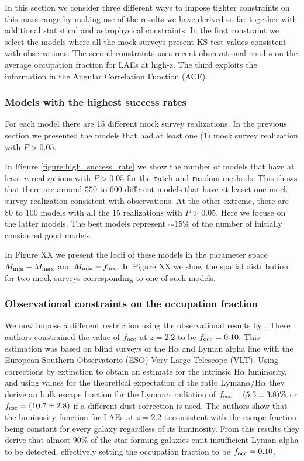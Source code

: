 \documentclass[usenatbib]{mn2e}
\begin{document}
In this section we consider three different ways to impose
tighter constraints on this mass range by making use of the results we
have derived so far together with additional statistical and
astrophysical constraints. In the first constraint we select the
models where all the mock surveys present KS-test values consistent
with observations. The second constraints uses recent observational
results on the average occupation fraction for LAEs at high-z. The
third exploits the information in the Angular Correlation Function
(ACF).  

\subsubsection{Models with the highest success rates}

For each model there are 15 different mock survey realizations. In the
previous section we presented the models that had at least one (1)
mock survey realization with $P>0.05$.

In Figure \ref{figure:high_success_rate} we show the number of models
that have at least $n$ realizations with $P>0.05$ for the {\texttt
  match} and {\texttt random} methods.  This shows that there are
around $550$ to $600$ different models that have at leaset one mock
survey realization consistent with observations. At the other extreme,
there are $80$ to $100$ models with all the 15 realizations with
$P>0.05$. Here we focuse on the latter models. The best models
represent $\sim 15\%$ of the number of initially considered good
models. 

In Figure XX we present the locii of these models in the parameter
space $M_{\rm min}-M_{\rm max}$ and $M_{\rm min}-f_{\rm occ}$. In
Figure XX we show the spatial distribution for two mock surveys
corresponding to one of such models. 




\subsubsection{Observational constraints on the occupation fraction}

We now impose a different restriction using the observational results
by \cite{Hayes2010}. These authors constrained the value of $f_{\rm
  occ}$ at $z=2.2$ to be $f_{\rm occ}=0.10$. This estimation was based
on blind surveys of the H$\alpha$ and Lyman alpha line with the European Southern
Observatorio (ESO) Very Large Telescope (VLT). Using corrections by
extinction to obtain an estimate for the intrinsic H$\alpha$
luminosity, and using values for the theoretical expectation of the
ratio Lyman$\alpha$/H$\alpha$ they derive an bulk escape fraction for
the Lyman$\alpha$ radiation of $f_{\rm esc}=(5.3\pm 3.8)\%$ or $f_{\rm
esc}=(10.7\pm 2.8)$ if a different dust correction is used. The
authors show that the luminosity function for LAEs at $z=2.2$ is
consistent with the escape fraction being constant for every galaxy
regardless of its luminosity. From this results they derive that
almost $90\%$ of the star forming galaxies emit insufficient
Lyman-alpha to be detected, effectively setting the occupation
fraction to be $f_{\rm occ}=0.10$.  
\end{document}
